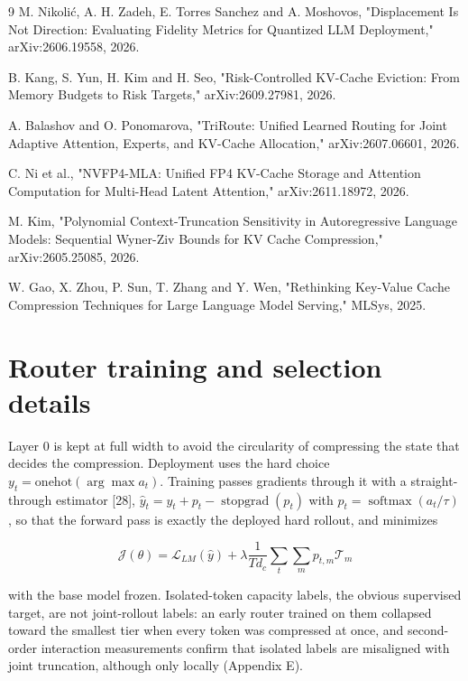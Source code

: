\documentclass[11pt]{article}
\begin{document}
\begin{thebibliography}{9}
 M. Nikolić, A. H. Zadeh, E. Torres Sanchez and A. Moshovos, "Displacement Is Not Direction: Evaluating Fidelity Metrics for Quantized LLM Deployment," arXiv:2606.19558, 2026.

 B. Kang, S. Yun, H. Kim and H. Seo, "Risk-Controlled KV-Cache Eviction: From Memory Budgets to Risk Targets," arXiv:2609.27981, 2026.

 A. Balashov and O. Ponomarova, "TriRoute: Unified Learned Routing for Joint Adaptive Attention, Experts, and KV-Cache Allocation," arXiv:2607.06601, 2026.

 C. Ni et al., "NVFP4-MLA: Unified FP4 KV-Cache Storage and Attention Computation for Multi-Head Latent Attention," arXiv:2611.18972, 2026.

 M. Kim, "Polynomial Context-Truncation Sensitivity in Autoregressive Language Models: Sequential Wyner-Ziv Bounds for KV Cache Compression," arXiv:2605.25085, 2026.

 W. Gao, X. Zhou, P. Sun, T. Zhang and Y. Wen, "Rethinking Key-Value Cache Compression Techniques for Large Language Model Serving," MLSys, 2025.

\end{thebibliography}

\appendix

\section{Router training and selection details}

Layer 0 is kept at full width to avoid the circularity of compressing the state that decides the compression. Deployment uses the hard choice $y_t=\text{onehot}(\arg\max a_t)$. Training passes gradients through it with a straight-through estimator [28], $\hat y_t = y_t + p_t-\operatorname{stopgrad}(p_t)$ with $p_t=\operatorname{softmax}(a_t/\tau)$, so that the forward pass is exactly the deployed hard rollout, and minimizes

\[\mathcal J(\theta)=\mathcal L_{LM}(\hat y)+\lambda\frac{1}{Td_c}\sum_t\sum_{m}p_{t,m}\mathcal T_m\]

with the base model frozen. Isolated-token capacity labels, the obvious supervised target, are not joint-rollout labels: an early router trained on them collapsed toward the smallest tier when every token was compressed at once, and second-order interaction measurements confirm that isolated labels are misaligned with joint truncation, although only locally (Appendix E).
\end{document}
